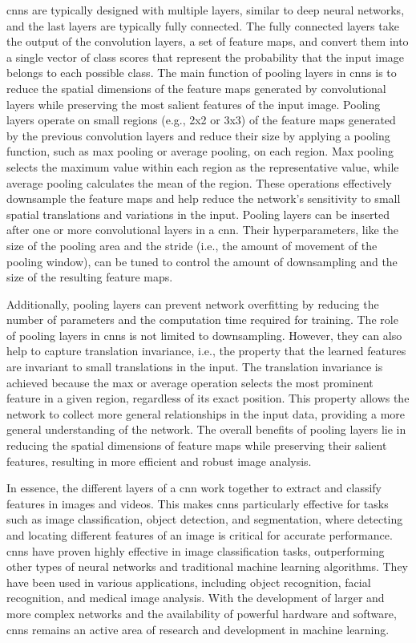     \glspl{cnn} are typically designed with multiple layers, similar to deep neural networks, and the last layers are typically fully connected. The fully connected layers take the output of the convolution layers, a set of feature maps, and convert them into a single vector of class scores that represent the probability that the input image belongs to each possible class. The main function of pooling layers in \glspl{cnn} is to reduce the spatial dimensions of the feature maps generated by convolutional layers while preserving the most salient features of the input image. Pooling layers operate on small regions (e.g., 2x2 or 3x3) of the feature maps generated by the previous convolution layers and reduce their size by applying a pooling function, such as max pooling or average pooling, on each region. Max pooling selects the maximum value within each region as the representative value, while average pooling calculates the mean of the region. These operations effectively downsample the feature maps and help reduce the network's sensitivity to small spatial translations and variations in the input. Pooling layers can be inserted after one or more convolutional layers in a \gls{cnn}. Their hyperparameters, like the size of the pooling area and the stride (i.e., the amount of movement of the pooling window), can be tuned to control the amount of downsampling and the size of the resulting feature maps.
    
    Additionally, pooling layers can prevent network overfitting by reducing the number of parameters and the computation time required for training. The role of pooling layers in \glspl{cnn} is not limited to downsampling. However, they can also help to capture translation invariance, i.e., the property that the learned features are invariant to small translations in the input. The translation invariance is achieved because the max or average operation selects the most prominent feature in a given region, regardless of its exact position. This property allows the network to collect more general relationships in the input data, providing a more general understanding of the network. The overall benefits of pooling layers lie in reducing the spatial dimensions of feature maps while preserving their salient features, resulting in more efficient and robust image analysis.
    
    In essence, the different layers of a \gls{cnn} work together to extract and classify features in images and videos. This makes \glspl{cnn} particularly effective for tasks such as image classification, object detection, and segmentation, where detecting and locating different features of an image is critical for accurate performance. \glspl{cnn} have proven highly effective in image classification tasks, outperforming other types of neural networks and traditional machine learning algorithms. They have been used in various applications, including object recognition, facial recognition, and medical image analysis. With the development of larger and more complex networks and the availability of powerful hardware and software, \glspl{cnn} remains an active area of research and development in machine learning.



